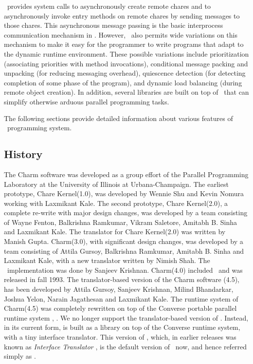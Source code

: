 \charmpp\ provides system calls to asynchronously create remote 
chares and to asynchronously invoke entry methods on remote chares by
sending  messages to those chares. This asynchronous 
message passing is the 
basic interprocess communication mechanism in \charmpp. However, \charmpp\ 
also permits wide variations on this mechanism to make it easy for the 
programmer to write programs that adapt to the dynamic runtime environment. 
These possible variations include prioritization (associating priorities with 
method invocations), conditional \index{message packing}message packing and 
unpacking (for reducing
messaging overhead), quiescence detection 
(for detecting completion of
some phase of the program), and dynamic load balancing (during remote object
creation). In addition, several libraries are built on top of \charmpp\
that can simplify otherwise arduous parallel programming tasks.

The following sections provide detailed information about various features
of \charmpp\ programming system.

\subsection{History}


The {\sc Charm} software was developed as a group effort of the Parallel
Programming Laboratory at the University of Illinois at Urbana-Champaign.
The earliest prototype, Chare Kernel(1.0), was developed by Wennie Shu
and Kevin Nomura working with Laxmikant Kale.  The second prototype,
Chare Kernel(2.0), a complete re-write with major design changes, was
developed by a team consisting of Wayne Fenton, Balkrishna Ramkumar,
Vikram Saletore, Amitabh B. Sinha and Laxmikant Kale. The translator
for Chare Kernel(2.0) was written by Manish Gupta.  {\sc Charm}(3.0), with
significant design changes, was developed by a team consisting of
Attila Gursoy, Balkrishna Ramkumar, Amitabh B.  Sinha and Laxmikant
Kale, with a new translator written by Nimish Shah.  The \charmpp\
implementation was done by Sanjeev Krishnan.  {\sc Charm}(4.0) included
\charmpp\ and was released in fall 1993.  The translator-based version
of the {\sc Charm} software (4.5), has been developed by Attila Gursoy,
Sanjeev Krishnan, Milind Bhandarkar, Joshua Yelon, Narain Jagathesan
and Laxmikant Kale.  The runtime system of {\sc Charm}(4.5) was completely
rewritten on top of the {\sc Converse} portable parallel runtime system
\cite{ConverseRTSPP98}, \cite{InterOpIPPS96}.  We no
longer support the translator-based version of \charmpp. Instead, in
its current form, \charmpp is built as a library on top of the Converse
runtime system, with a tiny interface translator. This version of
\charmpp, which, in earlier releases was known as {\em Interface
Translator \charmpp}, is the default version of \charmpp\ now, and
hence referred simply as {\bf \charmpp}.

